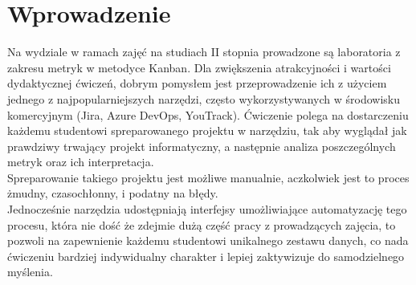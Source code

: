 \section{Wprowadzenie}
Na wydziale w ramach zajęć na studiach II stopnia prowadzone są laboratoria z zakresu metryk w metodyce Kanban.
Dla zwiększenia atrakcyjności i wartości dydaktycznej ćwiczeń, dobrym pomysłem jest przeprowadzenie ich z użyciem jednego z najpopularniejszych narzędzi,
często wykorzystywanych w środowisku komercyjnym (Jira, Azure DevOps, YouTrack).
Ćwiczenie polega na dostarczeniu każdemu studentowi spreparowanego projektu w narzędziu, tak aby wyglądał jak prawdziwy trwający projekt informatyczny,
a następnie analiza poszczególnych metryk oraz ich interpretacja.\\
Spreparowanie takiego projektu jest możliwe manualnie, aczkolwiek jest to proces żmudny, czasochłonny, i podatny na błędy.\\
Jednocześnie narzędzia udostępniają interfejsy umożliwiające automatyzację tego procesu, która nie dość że zdejmie dużą część pracy z prowadzących zajęcia,
to pozwoli na zapewnienie każdemu studentowi unikalnego zestawu danych, co nada ćwiczeniu bardziej indywidualny charakter i lepiej zaktywizuje do samodzielnego myślenia.\\

